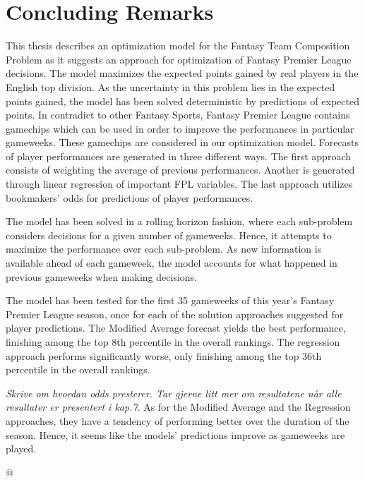 \chapter{Concluding Remarks}

This thesis describes an optimization model for the Fantasy Team Composition Problem as it suggests an approach for optimization of Fantasy Premier League decisions. The model maximizes the expected points gained by real players in the English top division. As the uncertainty in this problem lies in the expected points gained, the model has been solved deterministic by predictions of expected points. In contradict to other Fantasy Sports, Fantasy Premier League contains gamechips which can be used in order to improve the performances in particular gameweeks. These gamechips are considered in our optimization model. Forecasts of player performances are generated in three different ways. The first approach consists of weighting the average of previous performances. Another is generated through linear regression of important FPL variables. The last approach utilizes bookmakers' odds for predictions of player performances. 

\newpar

The model has been solved in a rolling horizon fashion, where each sub-problem considers decisions for a given number of gameweeks. Hence, it attempts to maximize the performance over each sub-problem. As new information is available ahead of each gameweek, the model accounts for what happened in previous gameweeks when making decisions. 
\newpar

The model has been tested for the first 35 gameweeks of this year's Fantasy Premier League season, once for each of the solution approaches suggested for player predictions. The Modified Average forecast yields the best performance, finishing among the top 8th percentile in the overall rankings. The regression approach performs significantly worse, only finishing among the top 36th percentile in the overall rankings. 
\newpar

\textit{Skrive om hvordan odds presterer. Tar gjerne litt mer om resultatene når alle resultater er presentert i kap.7}. As for the Modified Average and the Regression approaches, they have a tendency of performing better over the duration of the season. Hence, it seems like the models' predictions improve as gameweeks are played. 

\begin{comment}
- computational study tyder på at performance i siste delen av 2016 ikke er en indikator på performance i første delen av sesongen i 2017/2018
\end{comment}


@